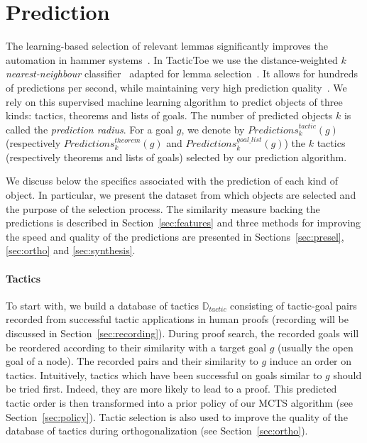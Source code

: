 \documentclass[runningheads,a4paper,draft]{svjour3}
\def\tactictoe{\textsf{TacticToe}\xspace}
\begin{document}
\section{Prediction}\label{s:prediction}
The learning-based selection of relevant lemmas significantly improves the
automation in hammer systems~\cite{BlanchetteGKKU16}. In \tactictoe we use the
distance-weighted \emph{$k$ nearest-neighbour} classifier~\cite{DudaniS76}
adapted for lemma selection~\cite{ckju-pxtp13}. It allows for hundreds of
predictions per second, while maintaining very high prediction quality~\cite{femalecop}.
We rely on this supervised machine learning algorithm to predict objects of
three kinds: tactics, theorems and lists of goals. The number of predicted
objects $k$ is
 called the \emph{prediction radius}. For a goal $g$, we denote
by $\mathit{Predictions}^{\mathit{tactic}}_k (g)$ (respectively
$\mathit{Predictions}^{\mathit{theorem}}_k (g)$
and $\mathit{Predictions}^{\mathit{goal\_list}}_k (g)$) the $k$ tactics
(respectively theorems and lists of goals) selected by our prediction algorithm.

We discuss below the specifics associated with the prediction of each kind of object.
In particular, we present the dataset from which objects are selected and the
purpose of the selection process. The similarity measure backing the
predictions is described in Section~\ref{sec:features} and three methods for
improving the speed and quality of the predictions are presented in
Sections~\ref{sec:presel}, \ref{sec:ortho} and \ref{sec:synthesis}.

\paragraph{Tactics}
To start with, we build a database of tactics
$\mathbb{D}_{\mathit{tactic}}$ consisting
of tactic-goal pairs recorded from successful tactic applications in human
proofs (recording will be discussed in
Section~\ref{sec:recording}).
During proof search, the recorded goals will be reordered according to their
similarity with a target goal $g$ (usually the open goal of a node).
The recorded pairs and their similarity to $g$ induce an
order on tactics. Intuitively, tactics which have been successful on
goals similar to $g$ should be tried first. Indeed, they are more likely to lead
to a proof.
This predicted tactic order is then transformed into a prior policy of our MCTS
algorithm (see Section~\ref{sec:policy}).
Tactic selection is also used to improve the quality of the database
of tactics during orthogonalization (see Section~\ref{sec:ortho}).
\end{document}
